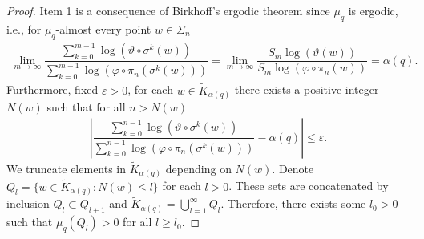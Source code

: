 \documentclass[11pt]{amsart}
\theoremstyle{remark}
\numberwithin{equation}{section}
\begin{document}
\begin{proof}Item 1 is a consequence of Birkhoff's ergodic theorem since $\mu_{q}$ is ergodic, i.e., for $\mu_{q}$-almost every point $w\in \Sigma_{n}$
\begin{align*}
    \lim_{m\to \infty}\dfrac{\sum^{m-1}_{k=0}\log(\vartheta\circ \sigma^{k}(w))}{\sum^{m-1}_{k=0}\log(\varphi \circ \pi_{n}(\sigma^{k}(w)))}=\lim_{m\to \infty }\dfrac{S_{m}\log(\vartheta(w))}{S_{m}\log (\varphi \circ \pi_{n}(w))}=\alpha(q).
\end{align*} Furthermore, fixed $\varepsilon>0$, for each $w\in \tilde{K}_{\alpha(q)}$ there exists a positive integer $N(w)$ such that for all $n>N(w)$
\begin{align}\label{Ecu8}
    \left|\dfrac{\sum^{n-1}_{k=0}\log(\vartheta\circ \sigma^{k}(w))}{\sum^{n-1}_{k=0}\log(\varphi \circ \pi_{n}(\sigma^{k}(w)))}-\alpha(q)\right|\leq \varepsilon.
\end{align} We truncate elements in $\tilde{K}_{\alpha(q)}$ depending on $N(w)$. Denote $Q_{l}=\{w\in \tilde{K}_{\alpha(q)}:N(w)\leq l \}$ for each $l>0$.  These sets are concatenated by inclusion $Q_{l}\subset Q_{l+1}$ and $\tilde{K}_{\alpha(q)}=\bigcup^{\infty}_{l=1}Q_{l}$. Therefore, there exists some $l_{0}>0$ such that $\mu_{q}(   Q_{l})>0$ for all $l \geq l_{0}$.


\end{proof}
\end{document}
